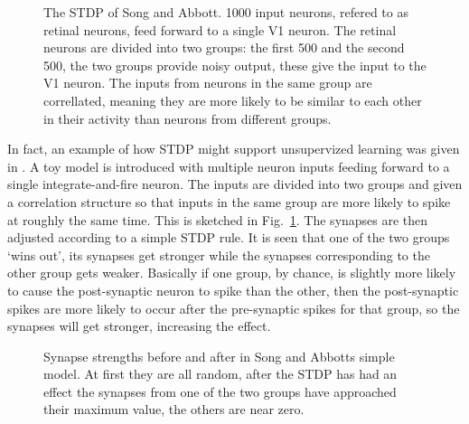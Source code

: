 \documentclass{article}
\begin{document}
\begin{figure}
\begin{center}
\end{center}
\caption{The STDP of Song and Abbott. 1000 input neurons, refered to
  as retinal neurons, feed forward to a single V1 neuron. The retinal
  neurons are divided into two groups: the first 500 and the second
  500, the two groups provide noisy output, these give the input to
  the V1 neuron. The inputs from neurons in the same group are
  correllated, meaning they are more likely to be similar to each other in their activity than neurons from different groups.\label{fig:sa_stdp}}
\end{figure}

In fact, an example of how STDP might support unsupervized learning
was given in \cite{SongEtAl2000a,SongAbbott2001a}. A toy model is
introduced with multiple neuron inputs feeding forward to a single
integrate-and-fire neuron. The inputs are divided into two groups and
given a correlation structure so that inputs in the same group are
more likely to spike at roughly the same time. This is sketched in
Fig.~\ref{fig:sa_stdp}. The synapses are then adjusted according to a
simple STDP rule. It is seen that one of the two groups \lq{}wins
out\rq{}, its synapses get stronger while the synapses corresponding
to the other group gets weaker. Basically if one group, by chance, is
slightly more likely to cause the post-synaptic neuron to spike than
the other, then the post-synaptic spikes are more likely to occur
after the pre-synaptic spikes for that group, so the synapses will get
stronger, increasing the effect.


\begin{figure}

\caption{Synapse strengths before and after in Song and Abbotts simple model. At first they are all random, after the STDP has had an effect the synapses from one of the two groups have approached their maximum value, the others are near zero. \label{fig:before_after}}
\end{figure}
\end{document}
